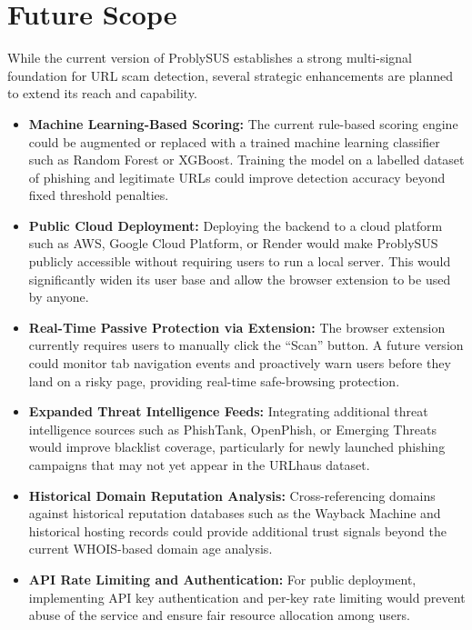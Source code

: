 \chapter*{Future Scope}

While the current version of ProblySUS establishes a strong multi-signal foundation for URL scam detection, several strategic enhancements are planned to extend its reach and capability.

\begin{itemize}

\item \textbf{Machine Learning-Based Scoring:}  
The current rule-based scoring engine could be augmented or replaced with a trained machine learning classifier such as Random Forest or XGBoost. Training the model on a labelled dataset of phishing and legitimate URLs could improve detection accuracy beyond fixed threshold penalties.

\item \textbf{Public Cloud Deployment:}  
Deploying the backend to a cloud platform such as AWS, Google Cloud Platform, or Render would make ProblySUS publicly accessible without requiring users to run a local server. This would significantly widen its user base and allow the browser extension to be used by anyone.

\item \textbf{Real-Time Passive Protection via Extension:}  
The browser extension currently requires users to manually click the ``Scan'' button. A future version could monitor tab navigation events and proactively warn users before they land on a risky page, providing real-time safe-browsing protection.

\item \textbf{Expanded Threat Intelligence Feeds:}  
Integrating additional threat intelligence sources such as PhishTank, OpenPhish, or Emerging Threats would improve blacklist coverage, particularly for newly launched phishing campaigns that may not yet appear in the URLhaus dataset.

\item \textbf{Historical Domain Reputation Analysis:}  
Cross-referencing domains against historical reputation databases such as the Wayback Machine and historical hosting records could provide additional trust signals beyond the current WHOIS-based domain age analysis.

\item \textbf{API Rate Limiting and Authentication:}  
For public deployment, implementing API key authentication and per-key rate limiting would prevent abuse of the service and ensure fair resource allocation among users.


\end{itemize}
